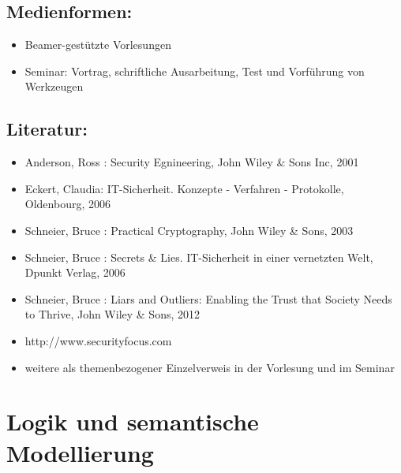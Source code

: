 \section*{Medienformen:}\label{medienformen-19}

\begin{itemize}
\tightlist
\item
  Beamer-gestützte Vorlesungen
\item
  Seminar: Vortrag, schriftliche Ausarbeitung, Test und Vorführung von
  Werkzeugen
\end{itemize}

\section*{Literatur:}\label{literatur-19}

\begin{itemize}
\tightlist
\item
  Anderson, Ross : Security Egnineering, John Wiley \& Sons Inc, 2001
\item
  Eckert, Claudia: IT-Sicherheit. Konzepte - Verfahren - Protokolle,
  Oldenbourg, 2006
\item
  Schneier, Bruce : Practical Cryptography, John Wiley \& Sons, 2003
\item
  Schneier, Bruce : Secrets \& Lies. IT-Sicherheit in einer vernetzten
  Welt, Dpunkt Verlag, 2006
\item
  Schneier, Bruce : Liars and Outliers: Enabling the Trust that Society
  Needs to Thrive, John Wiley \& Sons, 2012
\item
  http://www.securityfocus.com
\item
  weitere als themenbezogener Einzelverweis in der Vorlesung und im
  Seminar
\end{itemize}

\chapter{Logik und semantische
Modellierung}\label{logik-und-semantische-modellierung}

